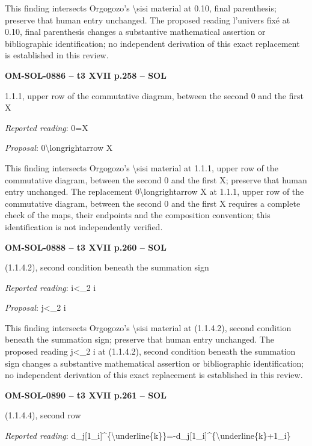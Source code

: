This finding intersects Orgogozo's \textbackslash{}sisi material at 0.10, final parenthesis; preserve that human entry unchanged. The proposed reading l'univers fixé at 0.10, final parenthesis changes a substantive mathematical assertion or bibliographic identification; no independent derivation of this exact replacement is established in this review.\par
\par\noindent\textbf{OM-SOL-0886 -- t3 XVII p.258 -- SOL}\par
1.1.1, upper row of the commutative diagram, between the second 0 and the first X\par
\emph{Reported reading}: 0=\allowbreak X\par
\emph{Proposal}: 0\textbackslash{}longrightarrow X\par
This finding intersects Orgogozo's \textbackslash{}sisi material at 1.1.1, upper row of the commutative diagram, between the second 0 and the first X; preserve that human entry unchanged. The replacement 0\textbackslash{}longrightarrow X at 1.1.1, upper row of the commutative diagram, between the second 0 and the first X requires a complete check of the maps, their endpoints and the composition convention; this identification is not independently verified.\par
\par\noindent\textbf{OM-SOL-0888 -- t3 XVII p.260 -- SOL}\par
(1.1.4.2), second condition beneath the summation sign\par
\emph{Reported reading}: i<\_2 i\par
\emph{Proposal}: j<\_2 i\par
This finding intersects Orgogozo's \textbackslash{}sisi material at (1.1.4.2), second condition beneath the summation sign; preserve that human entry unchanged. The proposed reading j<\_2 i at (1.1.4.2), second condition beneath the summation sign changes a substantive mathematical assertion or bibliographic identification; no independent derivation of this exact replacement is established in this review.\par
\par\noindent\textbf{OM-SOL-0890 -- t3 XVII p.261 -- SOL}\par
(1.1.4.4), second row\par
\emph{Reported reading}: d\_j[1\_i]\textasciicircum{}\{\textbackslash{}underline\{k\}\}=\allowbreak -d\_j[1\_i]\textasciicircum{}\{\textbackslash{}underline\{k\}+1\_i\}\par
